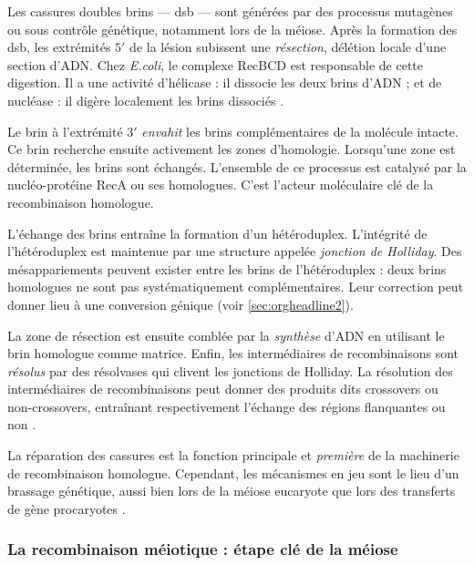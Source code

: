 \documentclass[11pt, oneside]{scrartcl}
\begin{document}
Les cassures doubles brins --- \ac{dsb} --- sont générées par des processus
mutagènes ou sous contrôle génétique, notamment lors de la méiose. Après la
formation des \ac{dsb}, les extrémités \(5'\) de la lésion subissent une
\emph{résection}, délétion locale d'une section d'ADN. Chez \emph{E.coli}, le complexe
RecBCD est responsable de cette digestion. Il a une activité d'hélicase : il
dissocie les deux brins d'ADN ; et de nucléase : il digère localement les brins
dissociés \cite{dillingham_recbcd_2008}.

Le brin à l'extrémité \(3'\) \emph{envahit} les brins complémentaires de la molécule
intacte. Ce brin recherche ensuite activement les zones d'homologie. Lorsqu'une
zone est déterminée, les brins sont échangés. L'ensemble de ce processus est
catalysé par la nucléo-protéine RecA \cite{chen_mechanism_2008} ou ses
homologues. C'est l'acteur moléculaire clé de la recombinaison homologue.

L'échange des brins entraîne la formation d'un hétéroduplex. L'intégrité de
l'hétéroduplex est maintenue par une structure appelée \emph{jonction de Holliday}.
Des mésappariements peuvent exister entre les brins de l'hétéroduplex : deux
brins homologues ne sont pas systématiquement complémentaires. Leur correction
peut donner lieu à une conversion génique (voir \ref{sec:orgheadline2}).

La zone de résection est ensuite comblée par la \emph{synthèse} d'ADN en utilisant le
brin homologue comme matrice. Enfin, les intermédiaires de recombinaisons sont
\emph{résolus} par des résolvases qui clivent les jonctions de Holliday. La résolution
des intermédiaires de recombinaisons peut donner des produits dits crossovers ou
non-crossovers, entraînant respectivement l'échange des régions flanquantes ou
non \cite{mancera_high-resolution_2008}.

\begin{transition}
La réparation des cassures est la fonction principale et \emph{première} de la
machinerie de recombinaison homologue. Cependant, les mécanismes en jeu sont le
lieu d'un brassage génétique, aussi bien lors de la méiose eucaryote que lors
des transferts de gène procaryotes \cite{redfield_bacteria_2001}.
\end{transition}

\subsubsection{La recombinaison méiotique : étape clé de la méiose}
\label{sec:orgheadline4}
\end{document}

